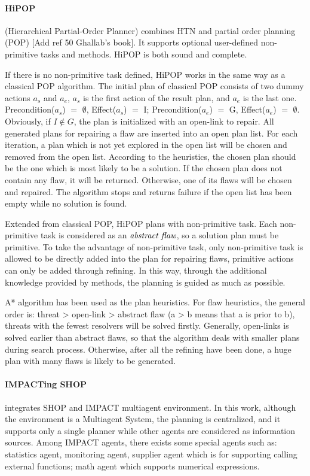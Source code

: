 \paragraph*{HiPOP}
\cite{hipop} (Hierarchical Partial-Order Planner) combines HTN and partial order planning (POP) [Add ref 50 Ghallab's book]. It supports optional user-defined non-primitive tasks and methods. HiPOP is both sound and complete. 

If there is no non-primitive task defined, HiPOP works in the same way as a classical POP algorithm. The initial plan of classical POP consists of two dummy actions $a_s$ and $a_e$, $a_s$ is the first action of the result plan, and $a_e$ is the last one. Precondition($a_s$) $=$ $\emptyset$, Effect($a_s$) $=$ I; Precondition($a_e$) $=$ G, Effect($a_e$) $=$ $\emptyset$. Obviously, if $I \not\in G$, the plan is initialized with an open-link to repair. All generated plans for repairing a flaw are inserted into an open plan list. For each iteration, a plan which is not yet explored in the open list will be chosen and removed from the open list. According to the heuristics, the chosen plan should be the one which is most likely to be a solution. If the chosen plan does not contain any flaw, it will be returned. Otherwise, one of its flaws will be chosen and repaired. The algorithm stops and returns failure if the open list has been empty while no solution is found.

Extended from classical POP, HiPOP plans with non-primitive task. Each non-primitive task is considered as an $\emph{abstract flaw}$, so a solution plan must be primitive. To take the advantage of non-primitive task, only non-primitive task is allowed to be directly added into the plan for repairing flaws, primitive actions can only be added through refining. In this way, through the additional knowledge provided by methods, the planning is guided as much as possible.

A* algorithm has been used as the plan heuristics. For flaw heuristics, the general order is: threat > open-link > abstract flaw (a > b means that a is prior to b), threats with the fewest resolvers will be solved firstly. Generally, open-links is solved earlier than abstract flaws, so that the algorithm deals with smaller plans during search process. Otherwise, after all the refining have been done, a huge plan with many flaws is likely to be generated.

\paragraph*{IMPACTing SHOP}
\cite{ishop} integrates SHOP and IMPACT \cite{Impact} multiagent environment. In this work, although the environment is a Multiagent System, the planning is centralized, and it supports only a single planner while other agents are considered as information sources. Among IMPACT agents, there exists some special agents such as: statistics agent, monitoring agent, supplier agent which is for supporting calling external functions; math agent which supports numerical expressions.


